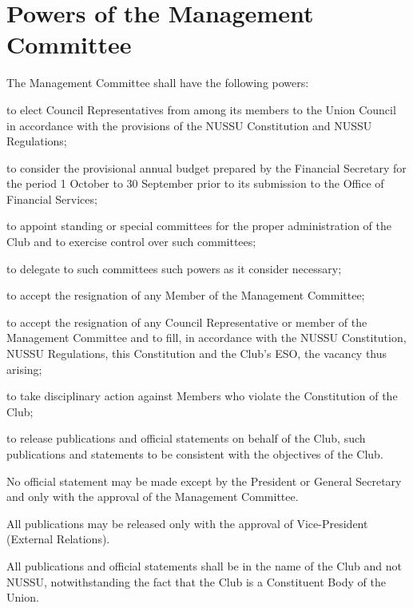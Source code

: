 \section{Powers of the Management Committee}
The Management Committee shall have the following powers:
	\begin{legal}
	\item to elect Council Representatives from among its members to the Union Council in accordance with the provisions of the NUSSU Constitution and NUSSU Regulations;
	\item to consider the provisional annual budget prepared by the Financial Secretary for the period 1 October to 30 September prior to its submission to the Office of Financial Services;
	\item to appoint standing or special committees for the proper administration of the Club and to exercise control over such committees;
		\begin{legal}
		\item to delegate to such committees such powers as it consider necessary;
		\end{legal}
	\item to accept the resignation of any Member of the Management Committee;
		\begin{legal}
		\item to accept the resignation of any Council Representative or member of the Management Committee and to fill, in accordance with the NUSSU Constitution, NUSSU Regulations, this Constitution and the Club’s ESO, the vacancy thus arising;
		\end{legal}
	\item to take disciplinary action against Members who violate the Constitution of the Club;
	\item to release publications and official statements on behalf of the Club, such publications and statements to be consistent with the objectives of the Club.
		\begin{legal}
		\item No official statement may be made except by the President or General Secretary and only with the approval of the Management Committee.
		\item All publications may be released only with the approval of Vice-President (External Relations).
		\item All publications and official statements shall be in the name of the Club and not NUSSU, notwithstanding the fact that the Club is a Constituent Body of the Union.
		\end{legal}

\end{legal}
